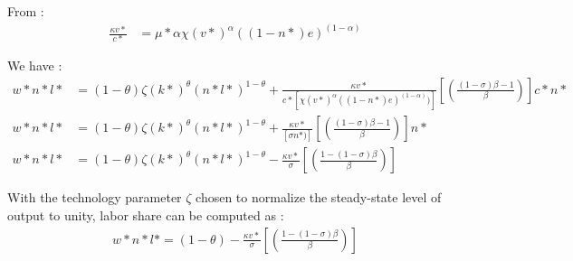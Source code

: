 \documentclass[english]{article}
\begin{document}
From :
\begin{align*}
 \frac{\kappa v*}{c*} &= \mu*\alpha\chi(v*)^{\alpha}((1-n*)e)^{(1-\alpha)} 
\end{align*}

We have :
\begin{align*}
w*n*l* &=(1-\theta)\zeta(k*)^{\theta}(n*l*)^{1-\theta}+\frac{\kappa v*}{c*\left[\chi(v*)^{\alpha}((1-n*)e)^{(1-\alpha)})\right]}\left[\left(\frac{\left(1-\sigma\right)\beta-1}{\beta}\right)\right]c*n* \\
w*n*l* &=(1-\theta)\zeta(k*)^{\theta}(n*l*)^{1-\theta}+\frac{\kappa v*}{\left[\sigma n*)\right]}\left[\left(\frac{\left(1-\sigma\right)\beta-1}{\beta}\right)\right]n* \\
w*n*l* &=(1-\theta)\zeta(k*)^{\theta}(n*l*)^{1-\theta}-\frac{\kappa v*}{\sigma}\left[\left(\frac{1-\left(1-\sigma\right)\beta}{\beta}\right)\right]
\end{align*}

With the technology parameter $\zeta$ chosen to normalize the steady-state level of output to unity, labor share can be computed as :
\begin{align*}
 w*n*l*=(1-\theta)-\frac{\kappa v*}{\sigma}\left[\left(\frac{1-\left(1-\sigma\right)\beta}{\beta}\right)\right]
\end{align*}
\end{document}
